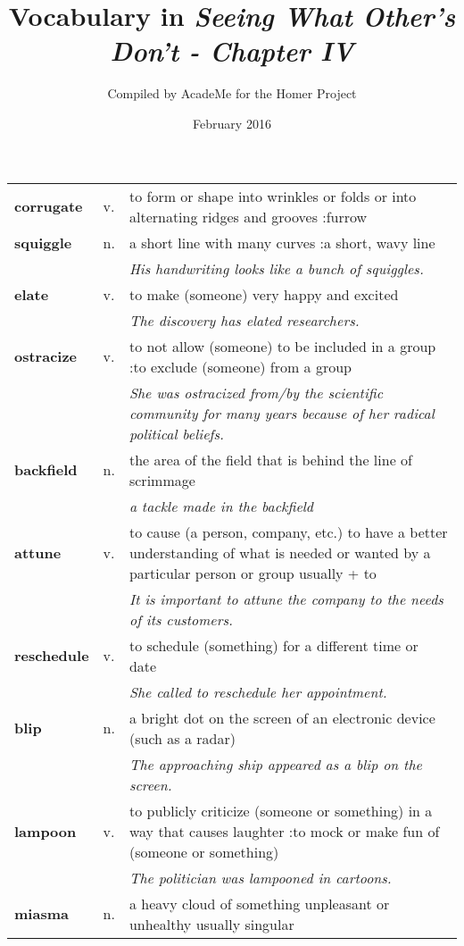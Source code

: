 \documentclass[a4paper]{article}
\title{Vocabulary in \textit{Seeing What Other's Don't - Chapter IV }}
\author{Compiled by AcadeMe for the Homer Project}
\date{February 2016}
\begin{document}
\maketitle
\begin{longtable}{llp{11cm}}
\textbf{corrugate} & v. &  to form or shape into wrinkles or folds or into alternating ridges and grooves :furrow\\[0.08cm]
\textbf{squiggle} & n. &  a short line with many curves :a short, wavy line \\
 & & \textit{His handwriting looks like a bunch of squiggles.}\\[0.08cm]
\textbf{elate} & v. &  to make (someone) very happy and excited \\
 & & \textit{The discovery has elated researchers.}\\[0.08cm]
\textbf{ostracize} & v. &  to not allow (someone) to be included in a group :to exclude (someone) from a group \\
 & & \textit{She was ostracized from/by the scientific community for many years because of her radical political beliefs.}\\[0.08cm]
\textbf{backfield} & n. &  the area of the field that is behind the line of scrimmage \\
 & & \textit{a tackle made in the backfield}\\[0.08cm]
\textbf{attune} & v. &  to cause (a person, company, etc.) to have a better understanding of what is needed or wanted by a particular person or group usually + to \\
 & & \textit{It is important to attune the company to the needs of its customers.}\\[0.08cm]
\textbf{reschedule} & v. &  to schedule (something) for a different time or date \\
 & & \textit{She called to reschedule her appointment.}\\[0.08cm]
\textbf{blip} & n. &  a bright dot on the screen of an electronic device (such as a radar) \\
 & & \textit{The approaching ship appeared as a blip on the screen.}\\[0.08cm]
\textbf{lampoon} & v. &  to publicly criticize (someone or something) in a way that causes laughter :to mock or make fun of (someone or something) \\
 & & \textit{The politician was lampooned in cartoons.}\\[0.08cm]
\textbf{miasma} & n. &  a heavy cloud of something unpleasant or unhealthy usually singular \\

\end{longtable}
\end{document}
